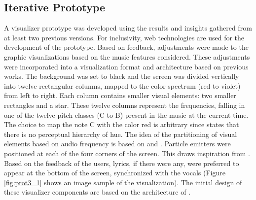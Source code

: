 \documentclass{sigchi-ext}
\begin{document}
\subsection{Iterative Prototype}
A visualizer prototype was developed using the results and insights gathered from at least two previous versions. For inclusivity, web technologies are used for the development of the prototype. Based on feedback, adjustments were made to the graphic visualizations based on the music features considered. These adjustments were incorporated into a visualization format and architecture based on previous works. The background was set to black and the screen was divided vertically into twelve rectangular columns, mapped to the color spectrum (red to violet) from left to right. Each column contains smaller visual elements: two smaller rectangles and a star. These twelve columns represent the frequencies, falling in one of the twelve pitch classes (C to B) present in the music at the current time. The choice to map the note C with the color red is arbitrary since \cite{Evans:2005} states that there is no perceptual hierarchy of hue. The idea of the partitioning of visual elements based on audio frequency is based on \cite{Nanayakkara:2009:EME} and \cite{Nanayakkara:2007}. Particle emitters were positioned at each of the four corners of the screen. This draws inspiration from \cite{Fonteles:2013}. Based on the feedback of the users, lyrics, if there were any, were preferred to appear at the bottom of the screen, synchronized with the vocals (Figure \ref{fig:prot3_1} shows an image sample of the visualization). The initial design of these visualizer components are based on the architecture of \cite{Nanayakkara:2007}.
\end{document}
